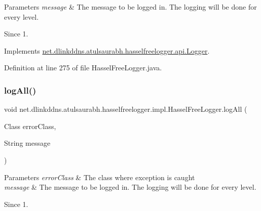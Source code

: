 \begin{DoxyParams}{Parameters}
{\em message} & The message to be logged in. The logging will be done for every level. \\
\hline
\end{DoxyParams}
\begin{DoxySince}{Since}
1. 
\end{DoxySince}


Implements \mbox{\hyperlink{interfacenet_1_1dlinkddns_1_1atulsaurabh_1_1hasselfreelogger_1_1api_1_1_logger_a800f4847161a507a83b0d6731a01c210}{net.\+dlinkddns.\+atulsaurabh.\+hasselfreelogger.\+api.\+Logger}}.



Definition at line 275 of file Hassel\+Free\+Logger.\+java.

\mbox{\label{classnet_1_1dlinkddns_1_1atulsaurabh_1_1hasselfreelogger_1_1impl_1_1_hassel_free_logger_ade5a00300f3406a3a64ca003b1799dbd}} 
\subsubsection{\texorpdfstring{log\+All()}{logAll()}\hspace{0.1cm}{\footnotesize\ttfamily [2/3]}}
{\footnotesize\ttfamily void net.\+dlinkddns.\+atulsaurabh.\+hasselfreelogger.\+impl.\+Hassel\+Free\+Logger.\+log\+All (\begin{DoxyParamCaption}\item[{Class}]{error\+Class,  }\item[{String}]{message }\end{DoxyParamCaption})}


\begin{DoxyParams}{Parameters}
{\em error\+Class} & The class where exception is caught \\
\hline
{\em message} & The message to be logged in. The logging will be done for every level. \\
\hline
\end{DoxyParams}
\begin{DoxySince}{Since}
1. 
\end{DoxySince}


